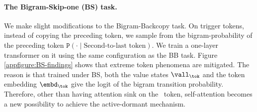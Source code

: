 \paragraph{The Bigram-Skip-one (BS) task.} We make slight modifications to the Bigram-Backcopy task. On trigger tokens, instead of copying the preceding token, we sample from the bigram-probability of the preceding token $\texttt{P}(\cdot\mid \text{Second-to-last token})$. We train a one-layer transformer on it using the same configuration as the BB task. Figure \ref{appfigure:BS-findings} shows that extreme token phenomena are mitigated. The reason is that trained under BS, both the value states $\vall_\tok$ and the token embedding $\embd_\tok$ give the logit of the bigram transition probability. Therefore, other than having attention sink on the \bos~token, self-attention becomes a new possibility to achieve the active-dormant mechanism.

